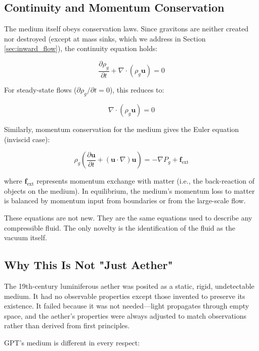 \documentclass[12pt, a4paper]{article}
\begin{document}
\subsection{Continuity and Momentum Conservation}
\label{subsec:continuity}

The medium itself obeys conservation laws. Since gravitons are neither created nor destroyed (except at mass sinks, which we address in Section \ref{sec:inward_flow}), the continuity equation holds:

\[
\frac{\partial \rho_g}{\partial t} + \nabla \cdot (\rho_g \mathbf{u}) = 0
\]

For steady-state flows (\( \partial \rho_g/\partial t = 0 \)), this reduces to:

\[
\nabla \cdot (\rho_g \mathbf{u}) = 0
\]

Similarly, momentum conservation for the medium gives the Euler equation (inviscid case):

\[
\rho_g \left( \frac{\partial \mathbf{u}}{\partial t} + (\mathbf{u} \cdot \nabla) \mathbf{u} \right) = -\nabla P_g + \mathbf{f}_{\text{ext}}
\]

where \( \mathbf{f}_{\text{ext}} \) represents momentum exchange with matter (i.e., the back-reaction of objects on the medium). In equilibrium, the medium's momentum loss to matter is balanced by momentum input from boundaries or from the large-scale flow.

These equations are not new. They are the same equations used to describe any compressible fluid. The only novelty is the identification of the fluid as the vacuum itself.

\subsection{Why This Is Not "Just Aether"}
\label{subsec:not_aether}

The 19th-century luminiferous aether was posited as a static, rigid, undetectable medium. It had no observable properties except those invented to preserve its existence. It failed because it was not needed—light propagates through empty space, and the aether's properties were always adjusted to match observations rather than derived from first principles.

GPT's medium is different in every respect:
\end{document}
